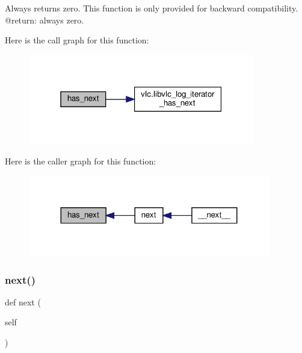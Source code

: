 \begin{DoxyVerb}Always returns zero.
This function is only provided for backward compatibility.
@return: always zero.
\end{DoxyVerb}
 Here is the call graph for this function\+:
\nopagebreak
\begin{figure}[H]
\begin{center}
\leavevmode
\includegraphics[width=280pt]{classvlc_1_1_log_iterator_aa8de9cca1082708d185d2850c9f2a29a_cgraph}
\end{center}
\end{figure}
Here is the caller graph for this function\+:
\nopagebreak
\begin{figure}[H]
\begin{center}
\leavevmode
\includegraphics[width=299pt]{classvlc_1_1_log_iterator_aa8de9cca1082708d185d2850c9f2a29a_icgraph}
\end{center}
\end{figure}
\mbox{\label{classvlc_1_1_log_iterator_a9dbee9488c9365114fed347d1a8846f1}} 
\subsubsection{\texorpdfstring{next()}{next()}}
{\footnotesize\ttfamily def next (\begin{DoxyParamCaption}\item[{}]{self }\end{DoxyParamCaption})}

